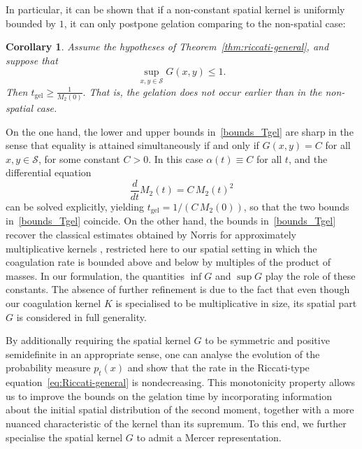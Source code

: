 \documentclass[12pt,twoside]{article}
\newtheorem{cor}[thm]{Corollary}
\begin{document}
In particular, it can be shown that if a non-constant spatial kernel is uniformly bounded by $1$, it can only postpone gelation comparing to the non-spatial case:
\begin{cor}%
\label{cor:normalized-kernel}
Assume the hypotheses of Theorem~\ref{thm:riccati-general}, and suppose that
$$
\sup_{x,y\in\mathcal S} G(x,y)\le 1.
$$
Then
$
t_{\mathrm{gel}}
\ge
\frac{1}{M_2(0)}.
$
That is, the gelation does not occur earlier than in the non-spatial case.
\end{cor}

On the one hand, the lower and upper bounds in~\eqref{bounds_Tgel} are sharp in
the sense that equality is attained simultaneously if and only if
$G(x,y)=C$ for all $x,y\in\mathcal S$, for some constant $C>0$.  
In this case $\alpha(t)\equiv C$ for all $t$, and the differential equation
\[
\frac{d}{dt}M_2(t)=C\,M_2(t)^2
\]
can be solved explicitly, yielding $t_{\mathrm{gel}}=1/(C\,M_2(0))$, so that
the two bounds in~\eqref{bounds_Tgel} coincide.  On the other hand, the bounds in~\eqref{bounds_Tgel} recover the classical
estimates obtained by Norris for approximately multiplicative kernels \cite[Thm.~2.2(ii)]{norris-cluster-coag},
restricted here to our spatial setting in which the coagulation rate is
bounded above and below by multiples of the product of masses.  
In our formulation, the quantities $\inf G$ and $\sup G$ play the role of
these constants.   The absence of further refinement is due to the fact that even though our coagulation kernel $K$ is specialised to be multiplicative in size,  its spatial part $G$ is considered in full generality.

By additionally requiring the spatial kernel $G$ to be symmetric and positive
semidefinite in an appropriate sense, one can analyse the evolution of the
probability measure $p_t(x)$ and show that the rate in the Riccati-type
equation~\eqref{eq:Riccati-general} is nondecreasing.  
This monotonicity property allows us to improve the bounds on the gelation
time by incorporating information about the initial spatial distribution of
the second moment, together with a more nuanced characteristic of the kernel
than its supremum.  
To this end, we further specialise the spatial kernel $G$ to admit a Mercer
representation.
\end{document}
